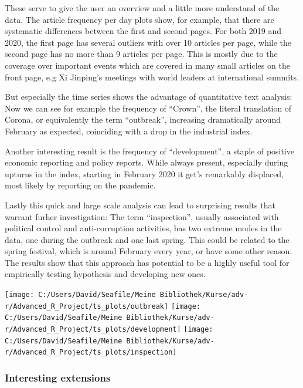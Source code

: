 \documentclass[12pt,a4paper]{article}
\let\origfigure\figure
\let\endorigfigure\endfigure
\renewenvironment{figure}[1][2] {
    \expandafter\origfigure\expandafter[H]
} {
    \endorigfigure
}
\begin{document}
These serve to give the user an overview and a little more understand of the data. The article frequency per day plots show, for example, that there are systematic differences between the first and second pages. For both 2019 and 2020, the first page has several outliers with over 10 articles per page, while the second page has no more than 9 articles per page. This is mostly due to the coverage over important events which are covered in many small articles on the front page, e.g Xi Jinping's meetings with world leaders at international summits.

But especially the time series shows the advantage of quantitative text analysis: Now we can see for example the frequency of \enquote{Crown}, the literal translation of Corona, or equivalently the term \enquote{outbreak}, increasing dramatically around February as expected, coinciding with a drop in the industrial index.

Another interesting result is the frequency of \enquote{development}, a staple of positive economic reporting and policy reports. While always present, especially during upturns in the index, starting in February 2020 it get's remarkably displaced, most likely by reporting on the pandemic.

Lastly this quick and large scale analysis can lead to surprising results that warrant furher investigation: The term \enquote{inspection}, usually associated with political control and anti-corruption activities, has two extreme modes in the data, one during the outbreak and one last spring. This could be related to the spring festival, which is around February every year, or have some other reason. The results show that this approach has potential to be a highly useful tool for empirically testing hypothesis and developing new ones.

\begin{figure}
\texttt{[image: C:/Users/David/Seafile/Meine Bibliothek/Kurse/adv-r/Advanced\_R\_Project/ts\_plots/outbreak]} \texttt{[image: C:/Users/David/Seafile/Meine Bibliothek/Kurse/adv-r/Advanced\_R\_Project/ts\_plots/development]} \texttt{[image: C:/Users/David/Seafile/Meine Bibliothek/Kurse/adv-r/Advanced\_R\_Project/ts\_plots/inspection]} \end{figure}

\hypertarget{interesting-extensions}{%
\subsubsection{Interesting extensions}\label{interesting-extensions}}
\end{document}

